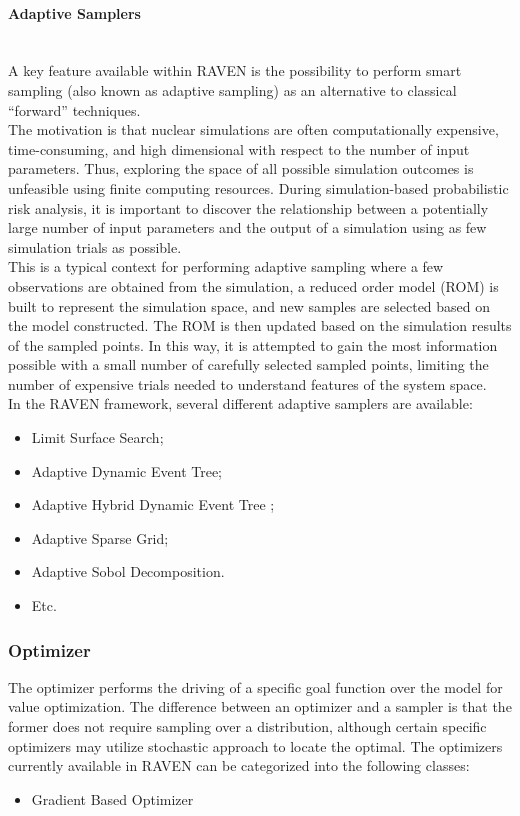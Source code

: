 \paragraph{Adaptive Samplers}~\\
A key feature available within RAVEN is the possibility to perform smart sampling (also known as adaptive sampling) as an 
alternative to classical ``forward'' techniques.
\\The motivation is that nuclear simulations are often computationally expensive, time-consuming, and high dimensional 
with respect to the number of input parameters. Thus, exploring the space of all possible simulation outcomes is unfeasible 
using finite computing resources. During simulation-based probabilistic risk analysis, it is important to discover the 
relationship between a potentially large number of input parameters and the output of a simulation using as few simulation 
trials as possible.
\\This is a typical context for performing adaptive sampling where a few observations are obtained from the simulation, a 
reduced order model (ROM) is built to represent the simulation space, and new samples are selected based on the model 
constructed. The ROM is then updated based on the simulation results of the sampled points. In this way, it is attempted to 
gain the most information possible with a small number of carefully selected sampled points, limiting the number of 
expensive trials needed to understand features of the system space.
\\In the RAVEN framework, several different adaptive samplers are available:
\begin{itemize}
\item Limit Surface Search;
\item Adaptive Dynamic Event Tree;
\item Adaptive Hybrid Dynamic Event Tree ;
\item Adaptive Sparse Grid;
\item Adaptive Sobol Decomposition.
\item Etc.
\end{itemize}


\subsubsection{Optimizer}
The optimizer performs the driving of a specific goal function over the model for value optimization. The difference between 
an optimizer and a sampler is that the former does not require sampling over a distribution, although certain specific 
optimizers may utilize stochastic approach to locate the optimal. The optimizers currently available in RAVEN can be 
categorized into the following classes:
\begin{itemize}
 \item Gradient Based Optimizer
\end{itemize}
